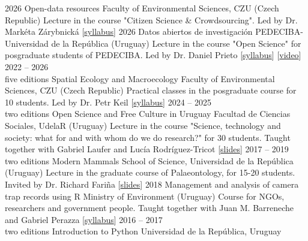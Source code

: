 \documentclass[9pt]{developercv} %
\begin{document}


\begin{entrylist}
	\entry
		{2026}
		{Open-data resources}
		{Faculty of Environmental Sciences, CZU (Czech Republic)}
		{Lecture in the course "Citizen Science \& Crowdsourcing". Led by Dr. Markéta Zárybnická [\href{https://home.czu.cz/en/zarybnicka/education}{syllabus}]}
	\entry
		{2026}
		{Datos abiertos de investigación}
		{PEDECIBA-Universidad de la República (Uruguay)}
		{Lecture in the course "Open Science" for posgraduate students of PEDECIBA. Led by Dr. Daniel Prieto [\href{https://www.pedeciba.edu.uy/es/curso/ciencia-abierta-2do-sem-2026/}{syllabus}] [\href{https://tube.interior.edu.uy/w/nhRMkTdBDZiBe86JumWjA3}{video}]}
	\entry
		{2022 -- 2026\\\footnotesize{five editions}}
		{Spatial Ecology and Macroecology}
		{Faculty of Environmental Sciences, CZU (Czech Republic)}
		{Practical classes in the posgraduate course for 10 students. Led by Dr. Petr Keil [\href{https://github.com/petrkeil/Spatial-Ecology-and-Macroecology}{syllabus}]}
	\entry
		{2024 -- 2025\\\footnotesize{two editions}}
		{Open Science and Free Culture in Uruguay}
		{Facultad de Ciencias Sociales, UdelaR (Uruguay)}
		{Lecture in the course "Science, technology and society: what for and with whom do we do research?" for 30 students. Taught together with Gabriel Laufer and Lucía Rodríguez-Tricot [\href{https://flograttarola.com/talk/ciencia-abierta-y-cultura-libre-en-uruguay/Biodiversidata_FCS_abril_2025.pdf}{slides}]}
	\entry
		{2017 -- 2019\\\footnotesize{two editions}}
		{Modern Mammals}
		{School of Science, Universidad de la Rep\'{u}blica (Uruguay)}
		{Lecture in the graduate course of Palaeontology, for 15-20 students. Invited by Dr. Richard Fari\~{n}a [\href{https://flograttarola.com/pdf/mamiferos_julana.pdf}{slides}]}
	\entry
		{2018}
		{Management and analysis of camera trap records using R}
		{Ministry of Environment (Uruguay)}
		{Course for NGOs, researchers and government people. Taught together with Juan M. Barreneche and Gabriel Perazza [\href{https://github.com/bienflorencia/curso_camtrapR}{syllabus}]}
	\entry
		{2016 -- 2017\\\footnotesize{two editions}}
		{Introduction to Python}
		{Universidad de la Rep\'{u}blica, Uruguay}

\end{entrylist}
\end{document}
